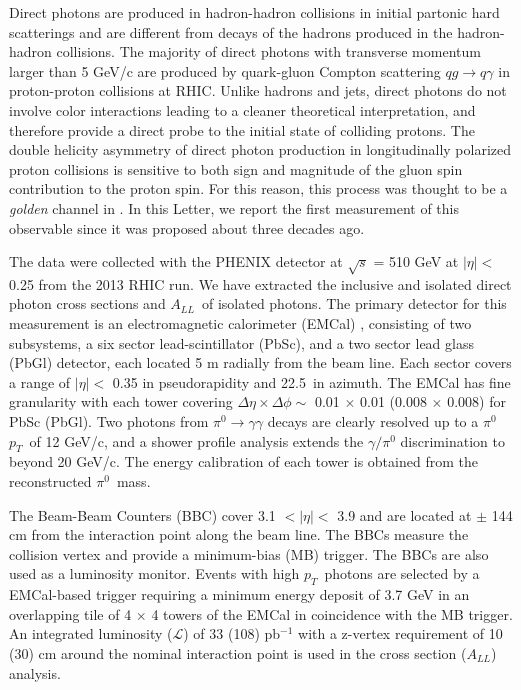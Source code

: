 \documentclass[twocolumn,letterpaper,aps,prl,longbibliography,superscriptaddress,floatfix]{revtex4-2}
\newcommand{\pT}{\ensuremath{p_T}}
\newcommand{\pizero}{\ensuremath{\pi^0}}
\newcommand{\ALL}{\ensuremath{A_{LL}}}
\begin{document}
Direct photons are produced in hadron-hadron collisions in initial partonic hard scatterings and are different from decays of the hadrons produced in the hadron-hadron collisions. The majority of direct photons with transverse momentum larger than 5 GeV/c are produced by quark-gluon Compton scattering $qg \rightarrow q\gamma$ in proton-proton collisions at RHIC. Unlike hadrons and jets, direct photons do not involve color interactions leading to a cleaner theoretical interpretation, and therefore provide a direct probe to the initial state of colliding protons. The double helicity asymmetry of direct photon production in longitudinally polarized proton collisions is sensitive to both sign and magnitude of the gluon spin contribution to the proton spin. For this reason, this process was thought to be a \textit{golden} channel in \cite{Bunce:1992vca, doi:10.1146/annurev.nucl.50.1.525}. In this Letter, we report the first measurement of this observable since it was proposed about three decades ago.

The data were collected with the PHENIX detector \cite{ADCOX2003469} at $\sqrt{s}$ = 510 GeV at $|\eta| <$ 0.25 from the 2013 RHIC run. We have extracted the inclusive and isolated direct photon cross sections and \ALL\ of isolated photons. The primary detector for this measurement is an electromagnetic calorimeter (EMCal) \cite{APHECETCHE2003521}, consisting of two subsystems, a six sector lead-scintillator (PbSc), and a two sector lead glass (PbGl) detector, each located 5 m radially from the beam line. Each sector covers a range of  $|\eta| <$ 0.35 in pseudorapidity and 22.5\textdegree\ in azimuth. The EMCal has fine granularity with each tower covering $\Delta\eta \times \Delta\phi \sim$ 0.01 $\times$ 0.01 (0.008 $\times$ 0.008) for PbSc (PbGl). Two photons from $\pi^0 \rightarrow \gamma\gamma$ decays are clearly resolved up to a \pizero\ \pT\ of 12 GeV/c, and a shower profile analysis extends the $\gamma/\pi^0$ discrimination to beyond 20 GeV/c. The energy calibration of each tower is obtained from the reconstructed \pizero\ mass.

The Beam-Beam Counters (BBC) \cite{ALLEN2003549} cover 3.1 $< |\eta| <$ 3.9 and are located at $\pm$ 144 cm from the interaction point along the beam line. The BBCs measure the collision vertex and provide a minimum-bias (MB) trigger. The BBCs are also used as a luminosity monitor. Events with high \pT\ photons are selected by a EMCal-based trigger requiring a minimum energy deposit of 3.7 GeV in an overlapping tile of 4 $\times$ 4 towers of the EMCal in coincidence with the MB trigger. An integrated luminosity ($\mathcal{L}$) of 33 (108) pb$^{-1}$ with a z-vertex requirement of 10 (30) cm around the nominal interaction point is used in the cross section (\ALL) analysis.
 
\end{document}
